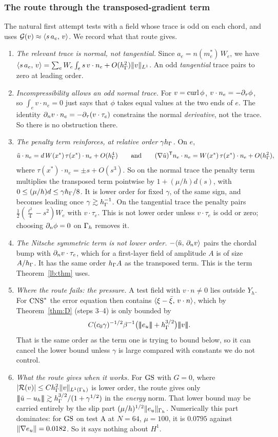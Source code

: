 \subsubsection{The route through the transposed-gradient term}\label{lb:sec:route}
The natural first attempt tests with a field whose trace is odd on each chord, and uses $\mathcal G(v)\approx\langle s\,a_e,\, v\rangle$. We record what that route gives.
\begin{enumerate}
\item \emph{The relevant trace is normal, not tangential.} Since $a_e=n(m_e^\ast)\,W_e$, we have $\langle s\,a_e,\, v\rangle=\sum_eW_e\int_es\,v\cdot n_e+O(h_\Gamma^2)\lVert v\rVert_{L^1}$. An odd \emph{tangential} trace pairs to zero at leading order.
\item \emph{Incompressibility allows an odd normal trace.} For $v=\operatorname{curl}\phi$, $v\cdot n_e=-\partial_\tau\phi$, so $\int_ev\cdot n_e=0$ just says that $\phi$ takes equal values at the two ends of $e$. The identity $\partial_n v\cdot n_e=-\partial_\tau(v\cdot\tau_e)$ constrains the normal \emph{derivative}, not the trace. So there is no obstruction there.
\item \emph{The penalty term reinforces, at relative order $\gamma h_\Gamma$.} On $e$,
\[
\tilde u\cdot n_e=d\,W(x^\ast)\,\tau(x^\ast)\cdot n_e+O(h_\Gamma^4)
\qquad\text{and}\qquad
(\nabla\tilde u)^{\mathsf T}n_e\cdot n_e=W(x^\ast)\,\tau(x^\ast)\cdot n_e+O(h_\Gamma^2),
\]
where $\tau(x^\ast)\cdot n_e=\pm s+O(s^3)$. So on the normal trace the penalty term multiplies the transposed term pointwise by $1+(\mu/h)d(s)$, with $0\le(\mu/h)d\le\gamma h_\Gamma/8$. It is lower order for fixed $\gamma$, of the same sign, and becomes leading once $\gamma\gtrsim h_\Gamma^{-1}$. On the tangential trace the penalty pairs $\frac12(\frac{\ell^2}4-s^2)W_e$ with $v\cdot\tau_e$. This is not lower order unless $v\cdot\tau_e$ is odd or zero; choosing $\partial_n\phi=0$ on $\Gamma_h$ removes it.
\item \emph{The Nitsche symmetric term is \emph{not} lower order.} $-\langle \tilde u,\, \partial_n v\rangle$ pairs the chordal bump with $\partial_n v\cdot\tau_e$, which for a first-layer field of amplitude $A$ is of size $A/h_\Gamma$. It has the same order $h_\Gamma A$ as the transposed term. This is the term Theorem~\ref{lb:thm} uses.
\item \emph{Where the route fails: the pressure.} A test field with $v\cdot n\neq0$ lies outside $Y_h$. For $\mathrm{CNS}^\ast$ the error equation then contains $\langle \xi-\bar\xi,\, v\cdot n\rangle$, which by Theorem~\ref{thm:D} (steps 3--4) is only bounded by
\[
C(c_0\gamma)^{-1/2}\beta^{-1}\bigl(\tnorm{e_u}+\hG^{3/2}\bigr)\tnorm v .
\]
That is the same order as the term one is trying to bound below, so it can cancel the lower bound unless $\gamma$ is large compared with constants we do not control.
\item \emph{What the route gives when it works.} For $\mathrm{GS}$ with $G=0$, where $|\mathcal R(v)|\le Ch_\Gamma^2\lVert v\rVert_{L^1(\Gamma_h)}$ is lower order, the route gives only $|\!|\!|\tilde u-u_h|\!|\!|\gtrsim h_\Gamma^{3/2}/(1+\gamma^{1/2})$ in the \emph{energy} norm. That lower bound may be carried entirely by the slip part $(\mu/h)^{1/2}\lVert e_u\rVert_{\Gamma_h}$. Numerically this part dominates: for $\mathrm{GS}$ on test A at $N=64$, $\mu=100$, it is $0.0795$ against $\lVert \nabla e_u\rVert=0.0182$. So it says nothing about $H^1$.
\end{enumerate}

